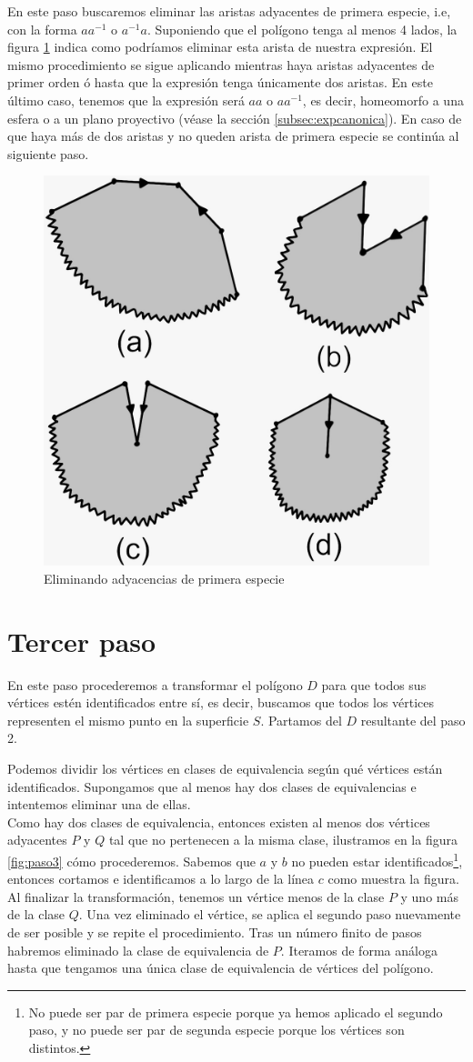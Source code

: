 \documentclass[a4paper,11pt,spanish, twoside, leqno]{tfg-uam}
\theoremstyle{definition}
\begin{document}
En este paso buscaremos eliminar las aristas adyacentes de primera especie, i.e, con la forma $aa^{-1}$ o $a^{-1}a$. Suponiendo que el polígono tenga al menos 4 lados, la figura \ref{fig:paso2} indica como podríamos eliminar esta arista de nuestra expresión. El mismo procedimiento se sigue aplicando mientras haya aristas adyacentes de primer orden ó hasta que la expresión tenga únicamente dos aristas. En este último caso, tenemos que la expresión será $aa$ o $aa^{-1}$, es decir, homeomorfo a una esfera o a un plano proyectivo (véase la sección \ref{subsec:expcanonica}). En caso de que haya más de dos aristas y no queden arista de primera especie se continúa al siguiente paso.
\begin{figure}[h!]
	\centering
	\includegraphics[width=0.4\linewidth]{imagenes/paso2.jpeg}
	\caption{Eliminando adyacencias de primera especie}
	\label{fig:paso2}
\end{figure}

\section{Tercer paso}

En este paso procederemos a transformar el polígono $D$ para que todos sus vértices estén identificados entre sí, es decir, buscamos que todos los vértices representen el mismo punto en la superficie $S$. Partamos del $D$ resultante del paso 2.

Podemos dividir los vértices en clases de equivalencia según qué vértices están identificados. Supongamos que al menos hay dos clases de equivalencias e intentemos eliminar una de ellas.\\
Como hay dos clases de equivalencia, entonces existen al menos dos vértices adyacentes $P$ y $Q$ tal que no pertenecen a la misma clase, ilustramos en la figura \ref{fig:paso3} cómo procederemos. Sabemos que $a$ y $b$ no pueden estar identificados\footnote{No puede ser par de primera especie porque ya hemos aplicado el segundo paso, y no puede ser par de segunda especie porque los vértices son distintos.}, entonces cortamos e identificamos a lo largo de la línea $c$ como muestra la figura. Al finalizar la transformación, tenemos un vértice menos de la clase $P$ y uno más de la clase $Q$. Una vez eliminado el vértice, se aplica el segundo paso nuevamente de ser posible y se repite el procedimiento. Tras un número finito de pasos habremos eliminado la clase de equivalencia de $P$. Iteramos de forma análoga hasta que tengamos una única clase de equivalencia de vértices del polígono.
\end{document}
